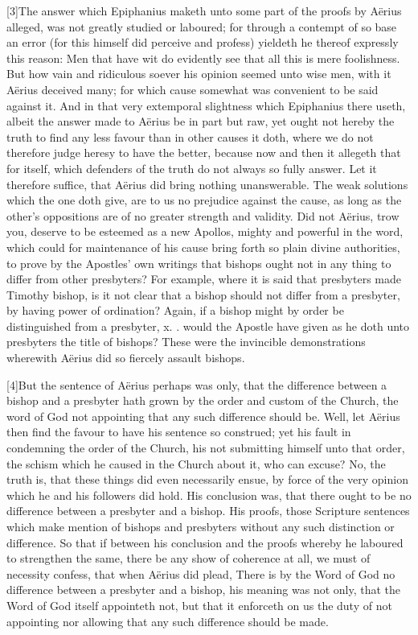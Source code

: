 [3]The answer which Epiphanius maketh unto some part of the proofs by Aërius alleged, was not greatly studied or laboured; for through a contempt of so base an error (for this himself did perceive and profess) yieldeth he thereof expressly this reason: Men that have wit do evidently see that all this is mere foolishness. But how vain and ridiculous soever his opinion seemed unto wise men, with it Aërius deceived many; for which cause somewhat was convenient to be said against it. And in that very extemporal slightness which Epiphanius there useth, albeit the answer made to Aërius be in part but raw, yet ought not hereby the truth to find any less favour than in other causes it doth, where we do not therefore judge heresy to have the better, because now and then it allegeth that for itself, which defenders of the truth do not always so fully answer. Let it therefore suffice, that Aërius did bring nothing unanswerable. The weak solutions which the one doth give, are to us no prejudice against the cause, as long as the other’s oppositions are of no greater strength and validity. Did not Aërius, trow you, deserve to be esteemed as a new Apollos, mighty and powerful in the word, which could for maintenance of his cause bring forth so plain divine authorities, to prove by the Apostles’ own writings that bishops ought not in any thing to differ from other presbyters? For example, where it is said that presbyters made Timothy bishop, is it not clear that a bishop should not differ from a presbyter, by having power of ordination? Again, if a bishop might by order be distinguished  from a presbyter,
 x. . would the Apostle have given as he doth unto presbyters the title of bishops? These were the invincible demonstrations wherewith Aërius did so fiercely assault bishops.

[4]But the sentence of Aërius perhaps was only, that the difference between a bishop and a presbyter hath grown by the order and custom of the Church, the word of God not appointing that any such difference should be. Well, let Aërius then find the favour to have his sentence so construed; yet his fault in condemning the order of the Church, his not submitting himself unto that order, the schism which he caused in the Church about it, who can excuse? No, the truth is, that these things did even necessarily ensue, by force of the very opinion which he and his followers did hold. His conclusion was, that there ought to be no difference between a presbyter and a bishop. His proofs, those Scripture sentences which make mention of bishops and presbyters without any such distinction or difference. So that if between his conclusion and the proofs whereby he laboured to strengthen the same, there be any show of coherence at all, we must of necessity confess, that when Aërius did plead, There is by the Word of God no difference between a presbyter and a bishop, his meaning was not only, that the Word of God itself appointeth not, but that it enforceth on us the duty of not appointing nor allowing that any such difference should be made.

